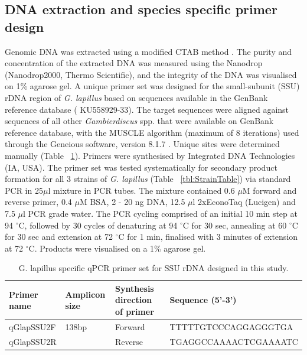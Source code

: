 \documentclass[10pt,letterpaper]{article}
\begin{document}
\subsection*{DNA extraction and species specific primer design}
\FloatBarrier
Genomic DNA was extracted using a modified CTAB method \citep{verma2016molecular}. 
The purity and concentration of the extracted DNA was measured using the Nanodrop (Nanodrop2000, Thermo Scientific), and the integrity of the DNA was visualised on 1\% agarose gel.
A unique primer set was designed for the small-subunit (SSU) rDNA region of \emph{G. lapillus} %
based on sequences available in the GenBank reference database (    KU558929-33). 
The target sequences were aligned against sequences of all other \emph{Gambierdiscus} spp. that were available on GenBank reference database, with the MUSCLE algorithm (maximum of 8 iterations) \citep{edgar2004muscle} used through the Geneious software, version 8.1.7 \citep{kearse2012geneious}. 
Unique sites were determined manually (Table ~\ref{tbl:PrimerTable}). 
Primers were synthesised by Integrated DNA Technologies (IA, USA).
The primer set was tested systematically for secondary product formation for all 3 strains of \emph{G. lapillus} (Table ~\ref{tbl:StrainTable}) via standard PCR in 25$\mu$l mixture in PCR tubes.
The mixture contained 0.6 $\mu$M forward and reverse primer, 0.4 $\mu$M BSA, 2 - 20 ng DNA, 12.5 $\mu$l 2xEconoTaq (Lucigen) and 7.5 $\mu$l PCR grade water.
The PCR cycling comprised of an initial 10 min step at 94 $^{\circ}$C, followed by 30 cycles of denaturing at 94 $^{\circ}$C for 30 sec, annealing at 60 $^{\circ}$C for 30 sec and extension at 72 $^{\circ}$C for 1 min, finalised with 3 minutes of extension at 72 $^{\circ}$C. 
Products were visualised on a 1\% agarose gel.
\begin{table}
\caption{G. lapillus specific qPCR primer set for SSU rDNA designed in this study.}
\label{tbl:PrimerTable}
\begin{tabular}{ | p{2.5cm} | p{2cm} | p{2cm} | p{6.5cm} | }
\hline
\textbf{Primer name} &\textbf{Amplicon size} &  \textbf{Synthesis direction of primer} & \textbf{Sequence (5'-3')} \\
\hline
qGlapSSU2F&138bp&Forward&TTTTTGTCCCAGGAGGGTGA\\
\hline
qGlapSSU2R&&Reverse&TGAGGCCAAAACTCGAAAATC\\
\hline
\end{tabular}
\end{table}
\FloatBarrier
\end{document}

